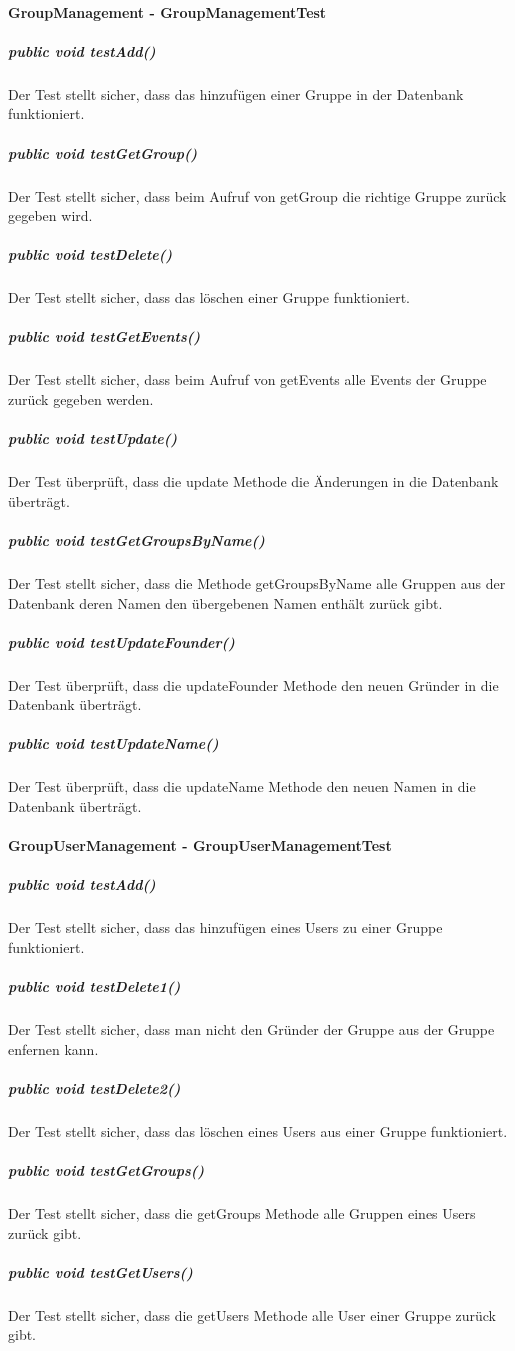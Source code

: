 \documentclass{scrartcl}
\begin{document}
	\paragraph{GroupManagement - GroupManagementTest}
	    \subparagraph{ public void testAdd()  }
	Der Test stellt sicher, dass das hinzufügen einer Gruppe in der Datenbank funktioniert.
    \subparagraph{    public void testGetGroup()     }
	Der Test stellt sicher, dass beim Aufruf von getGroup die richtige Gruppe zurück gegeben wird.
    \subparagraph{public void testDelete()   }
	Der Test stellt sicher, dass das löschen einer Gruppe funktioniert.
    \subparagraph{    public void testGetEvents()   }
	Der Test stellt sicher, dass beim Aufruf von getEvents alle Events der Gruppe zurück gegeben werden.
    \subparagraph{    public void testUpdate()    }
   	Der Test überprüft, dass die update Methode die Änderungen in die Datenbank überträgt.	
    \subparagraph{    public void testGetGroupsByName()     }
	Der Test stellt sicher, dass die Methode getGroupsByName alle Gruppen aus der Datenbank deren Namen den übergebenen Namen enthält zurück gibt.
    \subparagraph{    public void testUpdateFounder()     }
   	Der Test überprüft, dass die updateFounder Methode den neuen Gründer in die Datenbank überträgt.	
    \subparagraph{    public void testUpdateName()     }
       	Der Test überprüft, dass die updateName Methode den neuen Namen in die Datenbank überträgt.	
       	
 	\paragraph{GroupUserManagement - GroupUserManagementTest}
	\subparagraph{    public void testAdd()     }
	Der Test stellt sicher, dass das hinzufügen eines Users zu einer Gruppe funktioniert.
    \subparagraph{    public void testDelete1()     }
	Der Test stellt sicher, dass man nicht den Gründer der Gruppe aus der Gruppe enfernen kann.
    \subparagraph{    public void testDelete2()     }
   	Der Test stellt sicher, dass das löschen eines Users aus einer Gruppe funktioniert.
    \subparagraph{    public void testGetGroups()     }
   	Der Test stellt sicher, dass die getGroups Methode alle Gruppen eines Users zurück gibt.
    \subparagraph{    public void testGetUsers()   }
   	Der Test stellt sicher, dass die getUsers Methode alle User einer Gruppe zurück gibt.
   	
\end{document}
